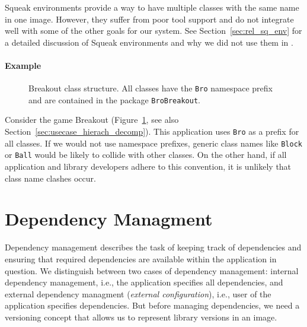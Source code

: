 Squeak environments provide a way to have multiple classes with the same name in one image. However, they suffer from poor tool support and do not integrate well with some of the other goals for our system. See Section~\ref{sec:rel_sq_env} for a detailed discussion of Squeak environments and why we did not use them in \msname.

\paragraph{Example}
\begin{figure}[!htp]
\caption[Breakout class structure]{Breakout class structure. All classes have the \texttt{Bro} namespace prefix and are contained in the package \texttt{BroBreakout}.}
\label{fig:conc_breakout}
\end{figure}

Consider the game Breakout (Figure~\ref{fig:conc_breakout}, see also Section~\ref{sec:usecase_hierach_decomp}). This application uses \texttt{Bro} as a prefix for all classes. If we would not use namespace prefixes, generic class names like \texttt{Block} or \texttt{Ball} would be likely to collide with other classes. On the other hand, if all application and library developers adhere to this convention, it is unlikely that class name clashes occur.

\section{Dependency Managment}
Dependency management describes the task of keeping track of dependencies and ensuring that required dependencies are available within the application in question. We distinguish between two cases of dependency management: internal dependency management, i.e., the application specifies all dependencies, and external dependency managment (\emph{external configuration}), i.e., user of the application specifies dependencies. But before managing dependencies, we need a versioning concept that allows us to represent library versions in an image.

